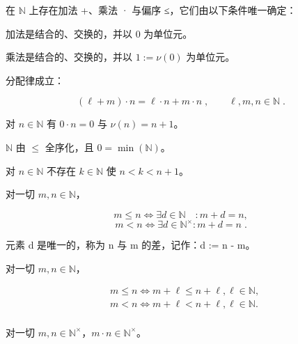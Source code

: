 \begin{theorem}

在 $ \mathbb{N} $ 上存在加法 +、乘法 · 与偏序 ≤，它们由以下条件唯一确定：

\begin{subitems}
\item

加法是结合的、交换的，并以 0 为单位元。

\item

乘法是结合的、交换的，并以 $ 1 := \nu(0) $ 为单位元。

\item

分配律成立：

\[
\left(\ell+m\right)\cdot n=\ell\cdot n+m\cdot n\;,\qquad\ell,m,n\in\mathbb{N}\;.
\]
\item

对 $ n \in \mathbb{N} $ 有 $ 0 \cdot n = 0 $ 与 $ \nu(n) = n + 1 $。

\item

$ \mathbb{N} $ 由 $ \leq $ 全序化，且 $ 0 = \min(\mathbb{N}) $。

\item

对 $ n \in \mathbb{N} $ 不存在 $ k \in \mathbb{N} $ 使 $ n < k < n+1 $。

\item

对一切 $ m, n \in \mathbb{N} $，

\[
m\leq n\iff\exists d\in\mathbb{N}\quad:m+d=n,
\]
\[
m<n\iff\exists d\in\mathbb{N}^{\times}\colon m+d=n\;.
\]

元素 d 是唯一的，称为 n 与 m 的差，记作：d := n - m。

\item

对一切 $ m, n \in \mathbb{N} $，

\begin{equation*}
\begin{aligned}
&m\leq n\iff m+\ell\leq n+\ell,\ell\in\mathbb{N},\\&m<n\iff m+\ell<n+\ell,\ell\in\mathbb{N}.\\
\end{aligned}
\end{equation*}
\item

对一切 $ m, n \in \mathbb{N}^\times $，$ m \cdot n \in \mathbb{N}^\times $。


\end{subitems}
\end{theorem}

